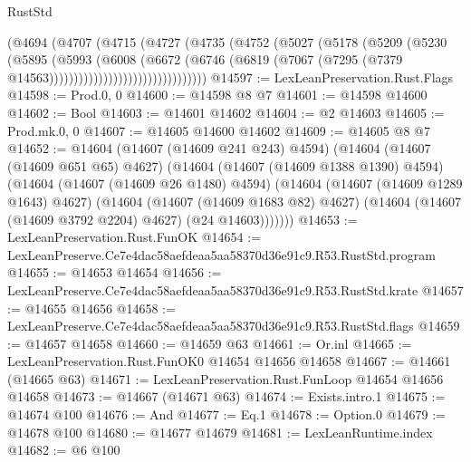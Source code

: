 \begin{lexlean}{RustStd}
\begin{coremodule}
                              (@4694
                                (@4707
                                  (@4715
                                    (@4727
                                      (@4735
                                        (@4752
                                          (@5027
                                            (@5178
                                              (@5209
                                                (@5230
                                                  (@5895
                                                    (@5993
                                                      (@6008
                                                        (@6672
                                                          (@6746
                                                            (@6819
                                                              (@7067
                                                                (@7295
                                                                  (@7379
                                                                    @14563))))))))))))))))))))))))))))))))
@14597 := LexLeanPreservation.Rust.Flags
@14598 := Prod.{0, 0}
@14600 := @14598 @8 @7
@14601 := @14598 @14600
@14602 := Bool
@14603 := @14601 @14602
@14604 := @2 @14603
@14605 := Prod.mk.{0, 0}
@14607 := @14605 @14600 @14602
@14609 := @14605 @8 @7
@14652 := @14604
    (@14607 (@14609 @241 @243) @4594)
    (@14604
      (@14607 (@14609 @651 @65) @4627)
      (@14604
        (@14607 (@14609 @1388 @1390) @4594)
        (@14604
          (@14607 (@14609 @26 @1480) @4594)
          (@14604
            (@14607 (@14609 @1289 @1643) @4627)
            (@14604
              (@14607 (@14609 @1683 @82) @4627)
              (@14604 (@14607 (@14609 @3792 @2204) @4627) (@24 @14603)))))))
@14653 := LexLeanPreservation.Rust.FunOK
@14654 := LexLeanPreserve.Ce7e4dac58aefdeaa5aa58370d36e91c9.R53.RustStd.program
@14655 := @14653 @14654
@14656 := LexLeanPreserve.Ce7e4dac58aefdeaa5aa58370d36e91c9.R53.RustStd.krate
@14657 := @14655 @14656
@14658 := LexLeanPreserve.Ce7e4dac58aefdeaa5aa58370d36e91c9.R53.RustStd.flags
@14659 := @14657 @14658
@14660 := @14659 @63
@14661 := Or.inl
@14665 := LexLeanPreservation.Rust.FunOK0 @14654 @14656 @14658
@14667 := @14661 (@14665 @63)
@14671 := LexLeanPreservation.Rust.FunLoop @14654 @14656 @14658
@14673 := @14667 (@14671 @63)
@14674 := Exists.intro.{1}
@14675 := @14674 @100
@14676 := And
@14677 := Eq.{1}
@14678 := Option.{0}
@14679 := @14678 @100
@14680 := @14677 @14679
@14681 := LexLeanRuntime.index
@14682 := @6 @100

\end{coremodule}
\end{lexlean}
